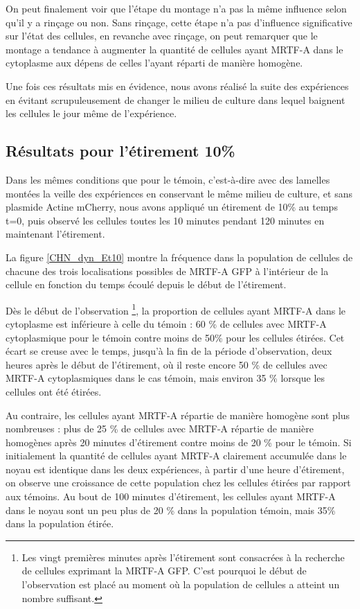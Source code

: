 On peut finalement voir que l'étape du montage n'a pas la même influence selon qu'il y a rinçage ou non. Sans rinçage, cette étape n'a pas d'influence significative sur l'état des cellules, en revanche avec rinçage, on peut remarquer que le montage a tendance à augmenter la quantité de cellules ayant MRTF-A dans le cytoplasme aux dépens de celles l'ayant réparti de manière homogène. 

Une fois ces résultats mis en évidence, nous avons réalisé la suite des expériences en évitant scrupuleusement de changer le milieu de culture dans lequel baignent les cellules le jour même de l'expérience. 

\subsection{Résultats pour l'étirement 10\%}

Dans les mêmes conditions que pour le témoin, c'est-à-dire avec des lamelles montées la veille des expériences en conservant le même milieu de culture, et sans plasmide Actine mCherry, nous avons appliqué un étirement de 10\% au temps t=0, puis observé les cellules toutes les 10 minutes pendant 120 minutes en maintenant l'étirement. 

La figure \ref{CHN_dyn_Et10} montre la fréquence dans la population de cellules de chacune des trois localisations possibles de MRTF-A GFP à l'intérieur de la cellule en fonction du temps écoulé depuis le début de l'étirement. 
 
Dès le début de l'observation \footnote{Les vingt premières minutes après l'étirement sont consacrées à la recherche de cellules exprimant la MRTF-A GFP. C'est pourquoi le début de l'observation est placé au moment où la population de cellules a atteint un nombre suffisant.}, la proportion de cellules ayant MRTF-A dans le cytoplasme est inférieure à celle du témoin : 60 \% de cellules avec MRTF-A cytoplasmique pour le témoin contre moins de 50\% pour les cellules étirées. Cet écart se creuse avec le temps, jusqu'à la fin de la période d'observation, deux heures après le début de l'étirement, où il reste encore 50 \% de cellules avec MRTF-A cytoplasmiques dans le cas témoin, mais environ 35 \% lorsque les cellules ont été étirées. 

Au contraire, les cellules ayant MRTF-A répartie de manière homogène sont plus nombreuses : plus de 25 \% de cellules avec MRTF-A répartie de manière homogènes après 20 minutes d'étirement contre moins de 20  \% pour le témoin. 
Si initialement la quantité de cellules ayant MRTF-A clairement accumulée dans le noyau est identique dans les deux expériences, à partir d'une heure d'étirement, on observe une croissance de cette population chez les cellules étirées par rapport aux témoins. Au bout de 100 minutes d'étirement, les cellules ayant MRTF-A dans le noyau sont un peu plus de 20 \% dans la population témoin, mais 35\% dans la population étirée. 



